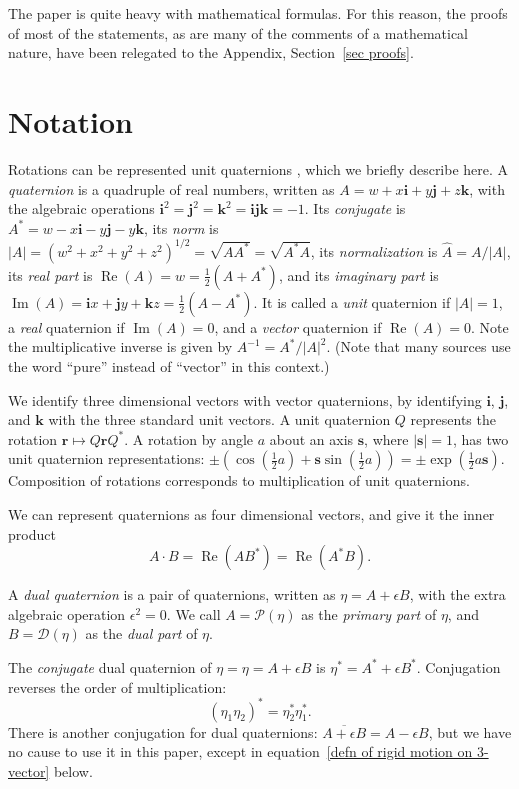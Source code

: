 \documentclass[reqno,12pt]{amsart}
\newcommand\bi{\bm i}
\newcommand\bj{\bm j}
\newcommand\bk{\bm k}
\DeclareMathOperator\realpart{Re}
\DeclareMathOperator\imagpart{Im}
\begin{document}
The paper is quite heavy with mathematical formulas.  For this reason, the proofs of most of the statements, as are many of the comments of a mathematical nature, have been relegated to the Appendix, Section~\ref{sec proofs}.

\section{Notation}

Rotations can be represented unit quaternions \cite{quaternions1,quaternions2}, which we briefly describe here.  A \emph{quaternion} is a quadruple of real numbers, written as $A = w + x \bi + y \bj + z \bk$, with the algebraic operations $\bi^2 = \bj^2 = \bk^2 = \bi \bj \bk = -1$.  Its \emph{conjugate} is $A^* = w - x \bi - y \bj - y \bk$, its \emph{norm} is $|A| = (w^2+x^2+y^2+z^2)^{1/2} = \sqrt{A A^*} = \sqrt{A^* A}$, its \emph{normalization} is $\widehat A = A/|A|$, its \emph{real part} is $\realpart(A) = w = \tfrac12(A + A^*)$, and its \emph{imaginary part} is $\imagpart(A) = \bi x + \bj y + \bk z = \tfrac12(A - A^*)$.  It is called a \emph{unit} quaternion if $|A| = 1$, a \emph{real} quaternion if $\imagpart(A) = 0$, and a \emph{vector} quaternion if $\realpart(A) = 0$.  Note the multiplicative inverse is given by $A^{-1} = A^*/|A|^2$.  (Note that many sources use the word ``pure'' instead of ``vector'' in this context.)

We identify three dimensional vectors with vector quaternions, by identifying $\bi$, $\bj$, and $\bk$ with the three standard unit vectors.  A unit quaternion $Q$ represents the rotation $\bm r \mapsto Q \bm r Q^*$.  A rotation by angle $a$ about an axis $\bm s$, where $|\bm s| = 1$, has two unit quaternion representations: $\pm(\cos(\tfrac12 a) + \bm s \sin(\tfrac12 a)) = \pm \exp(\tfrac12 a \bm s)$.  Composition of rotations corresponds to multiplication of unit quaternions.

We can represent quaternions as four dimensional vectors, and give it the inner product
\begin{equation}
A \cdot B = \realpart(A B^*) = \realpart(A^* B) .
\end{equation}

A \emph{dual quaternion} is a pair of quaternions, written as $\eta = A + \epsilon B$, with the extra algebraic operation $\epsilon^2 = 0$.  We call $A = \mathcal P(\eta)$ as the \emph{primary part} of $\eta$, and $B = \mathcal D(\eta)$ as the \emph{dual part} of $\eta$.

The \emph{conjugate} dual quaternion of $\eta = \eta = A + \epsilon B$ is $\eta^* = A^* + \epsilon B^*$.  Conjugation reverses the order of multiplication:
\begin{equation}
(\eta_1\eta_2)^* = \eta_2^* \eta_1^* .
\end{equation}
There is another conjugation for dual quaternions: $\overline{A + \epsilon B} = A - \epsilon B$, but we have no cause to use it in this paper, except in equation~\eqref{defn of rigid motion on 3-vector} below.
\end{document}
